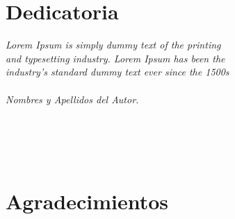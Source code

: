 \chapter*{Dedicatoria}
\label{empty}
\setlength{\leftmargin}{0.5\textwidth}
\setlength{\parsep}{0cm}
\addtolength{\topsep}{0.5cm}
\begin{flushright}
	\small\em{
		Lorem Ipsum is simply dummy text of the printing\\
		and typesetting industry. Lorem Ipsum has been the\\
		industry's standard dummy text ever since the 1500s\\~\\
		Nombres y Apellidos del Autor.\\~\\~\\~\\~\\
	}
\end{flushright}


\chapter*{Agradecimientos}
\label{agradecimientos}

\thispagestyle{empty}
\vspace{1cm}
\par \lipsum[1-1]

